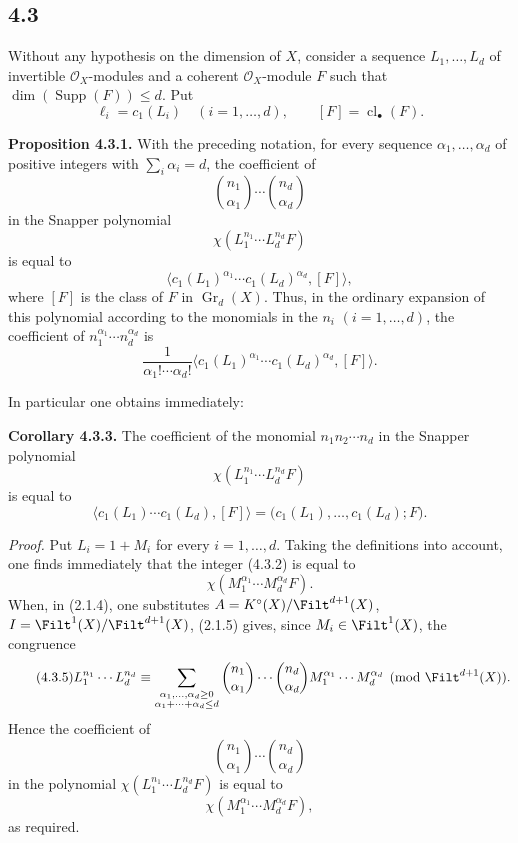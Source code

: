\documentclass[11pt]{article}
\newcommand{\Gr}{\operatorname{Gr}}
\newcommand{\cl}{\operatorname{cl}}
\providecommand{\Gr}{\operatorname{Gr}}
\providecommand{\Supp}{\operatorname{Supp}}
\providecommand{\Gr}{\operatorname{G}}
\begin{document}
\subsection*{4.3}
Without any hypothesis on the dimension of \(X\), consider a sequence \(L_1,\ldots,L_d\) of invertible \(\mathcal O_X\)-modules and a coherent \(\mathcal O_X\)-module \(F\) such that \(\dim(\Supp(F))\leq d\). Put
\[
 \ell_i=c_1(L_i)\quad (i=1,\ldots,d),\qquad [F]=\cl_\bullet(F).
\]

\textbf{Proposition 4.3.1.} With the preceding notation, for every sequence \(\alpha_1,\ldots,\alpha_d\) of positive integers with \(\sum_i\alpha_i=d\), the coefficient of
\[
 \binom{n_1}{\alpha_1}\cdots \binom{n_d}{\alpha_d}
\]
in the Snapper polynomial
\[
 \chi(L_1^{n_1}\cdots L_d^{n_d}F)
\]
is equal to
\begin{equation}\tag{4.3.2}
 \bigl\langle c_1(L_1)^{\alpha_1}\cdots c_1(L_d)^{\alpha_d},[F]\bigr\rangle,
\end{equation}
where \([F]\) is the class of \(F\) in \(\Gr_d(X)\). Thus, in the ordinary expansion of this polynomial according to the monomials in the \(n_i\) \((i=1,\ldots,d)\), the coefficient of \(n_1^{\alpha_1}\cdots n_d^{\alpha_d}\) is
\[
 \frac{1}{\alpha_1!\cdots\alpha_d!}
 \bigl\langle c_1(L_1)^{\alpha_1}\cdots c_1(L_d)^{\alpha_d},[F]\bigr\rangle.
\]

In particular one obtains immediately:

\textbf{Corollary 4.3.3.} The coefficient of the monomial \(n_1n_2\cdots n_d\) in the Snapper polynomial
\[
 \chi(L_1^{n_1}\cdots L_d^{n_d}F)
\]
is equal to
\begin{equation}\tag{4.3.4}
 \bigl\langle c_1(L_1)\cdots c_1(L_d),[F]\bigr\rangle
 =
 \bigl(c_1(L_1),\ldots,c_1(L_d);F\bigr).
\end{equation}

\emph{Proof.} Put \(L_i=1+M_i\) for every \(i=1,\ldots,d\). Taking the definitions into account, one finds immediately that the integer (4.3.2) is equal to
\[
 \chi(M_1^{\alpha_1}\cdots M_d^{\alpha_d}F).
\]
When, in (2.1.4), one substitutes \(A=K^\circ(X)/\Filt^{d+1}(X)\), \(I=\Filt^1(X)/\Filt^{d+1}(X)\), (2.1.5) gives, since \(M_i\in\Filt^1(X)\), the congruence
\begin{equation}\tag{4.3.5}
 L_1^{n_1}\cdots L_d^{n_d}
 \equiv
 \sum_{\substack{\alpha_1,\ldots,\alpha_d\geq0\\ \alpha_1+\cdots+\alpha_d\leq d}}
 \binom{n_1}{\alpha_1}\cdots\binom{n_d}{\alpha_d}
 M_1^{\alpha_1}\cdots M_d^{\alpha_d}
 \pmod{\Filt^{d+1}(X)}.
\end{equation}
Hence the coefficient of
\[
 \binom{n_1}{\alpha_1}\cdots\binom{n_d}{\alpha_d}
\]
in the polynomial \(\chi(L_1^{n_1}\cdots L_d^{n_d}F)\) is equal to
\[
 \chi(M_1^{\alpha_1}\cdots M_d^{\alpha_d}F),
\]
as required.
\end{document}
